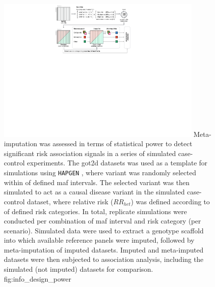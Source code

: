 

\begin{figure}[!htb]
\centering
\includegraphics[width=0.9\textwidth]{./img/ch2/info_design_power}
{Meta-imputation was assessed in terms of statistical power to detect significant risk association signals in a series of simulated case-control experiments.
The \gls{got2d} datasets was used as a template for simulations using \texttt{HAPGEN} \citep{Su:2011km}, where  variant was randomly selected within  of  defined \gls{maf} intervals.
The selected variant was then simulated to act as a causal disease variant in the simulated case-control dataset, where relative risk ($RR_{het}$) was defined according to  of  defined risk categories.
In total,  replicate simulations were conducted per combination of \gls{maf} interval and risk category (per scenario).
Simulated data were used to extract a genotype scaffold into which available reference panels were imputed, followed by meta-imputation of imputed datasets.
Imputed and meta-imputed datasets were then subjected to association analysis, including the simulated (not imputed) datasets for comparison.}
{fig:info_design_power}
\end{figure}
